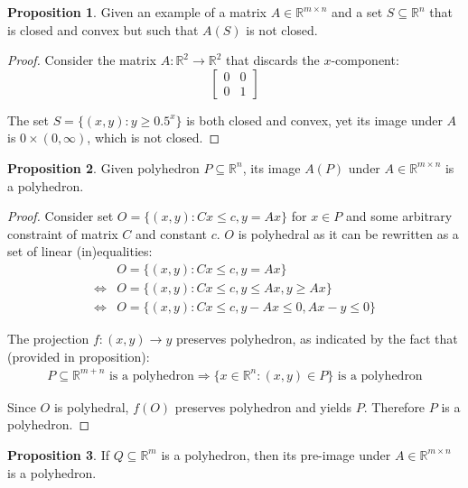 \documentclass[12pt]{article}
\newcommand{\RR}{\mathbb{R}}
\theoremstyle{definition}
\newtheorem{prop}{Proposition}[section]
\begin{document}
	\begin{prop}
		Given an example of a matrix $A \in \RR^{m \times n}$ and a set $S \subseteq \RR^n$ that is closed and convex but such that $A(S)$ is not closed.
	\end{prop}
	
	\begin{proof}
		Consider the matrix $A: \RR^2 \to \RR^2$ that discards the $x$-component:
		\begin{equation*}
		\begin{bmatrix}
			0&0\\0&1	
		\end{bmatrix}
		\end{equation*}
		
		The set $S = \{(x, y):y \geq 0.5^x\}$ is both closed and convex, yet its image under $A$ is $0 \times (0, \infty)$, which is not closed.
	\end{proof}
	
	\begin{prop}
		Given polyhedron $P \subseteq \RR^n$, its image $A(P)$ under $A \in \RR^{m \times n}$ is a polyhedron.
	\end{prop}
	
	\begin{proof}
		Consider set $O = \{(x, y): Cx \leq c, y=Ax\}$ for $x \in P$ and  some arbitrary constraint of matrix $C$ and constant $c$. $O$ is polyhedral as it can be rewritten as a set of linear (in)equalities:
		\begin{align*}
			&O = \{(x, y): Cx \leq c, y=Ax\}\\
			\iff &O = \{(x, y): Cx \leq c, y \leq Ax, y \geq Ax\} \\
			\iff &O = \{(x, y): Cx \leq c, y - Ax\leq 0, Ax - y \leq 0\}
		\end{align*}
		
		The projection $f: (x, y) \to y$ preserves polyhedron, as indicated by the fact that (provided in proposition):
		\begin{gather*}
			P \subseteq \RR^{m + n} \text{ is a polyhedron} \Rightarrow \{x \in \RR^n: (x, y) \in P\} \text{ is a polyhedron}
		\end{gather*}
		
		Since $O$ is polyhedral, $f(O)$ preserves polyhedron and yields $P$. Therefore $P$ is a polyhedron.
	\end{proof}
	
	\begin{prop}
		If $Q \subseteq \RR^m$ is a polyhedron, then its pre-image under $A \in \RR^{m \times n}$ is a polyhedron.
	\end{prop}
	
\end{document}

